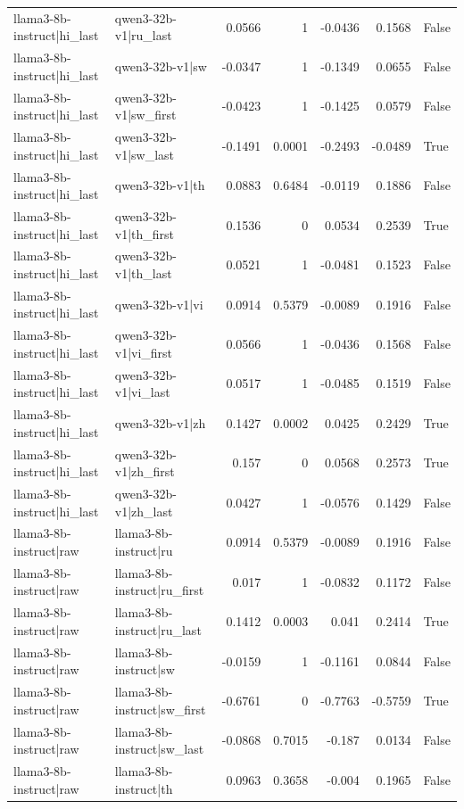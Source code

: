 \begin{table}
\begin{tabular}{l l r r r r l}
llama3-8b-instruct|hi_last & qwen3-32b-v1|ru_last & 0.0566 & 1 & -0.0436 & 0.1568 & False \\
llama3-8b-instruct|hi_last & qwen3-32b-v1|sw & -0.0347 & 1 & -0.1349 & 0.0655 & False \\
llama3-8b-instruct|hi_last & qwen3-32b-v1|sw_first & -0.0423 & 1 & -0.1425 & 0.0579 & False \\
llama3-8b-instruct|hi_last & qwen3-32b-v1|sw_last & -0.1491 & 0.0001 & -0.2493 & -0.0489 & True \\
llama3-8b-instruct|hi_last & qwen3-32b-v1|th & 0.0883 & 0.6484 & -0.0119 & 0.1886 & False \\
llama3-8b-instruct|hi_last & qwen3-32b-v1|th_first & 0.1536 & 0 & 0.0534 & 0.2539 & True \\
llama3-8b-instruct|hi_last & qwen3-32b-v1|th_last & 0.0521 & 1 & -0.0481 & 0.1523 & False \\
llama3-8b-instruct|hi_last & qwen3-32b-v1|vi & 0.0914 & 0.5379 & -0.0089 & 0.1916 & False \\
llama3-8b-instruct|hi_last & qwen3-32b-v1|vi_first & 0.0566 & 1 & -0.0436 & 0.1568 & False \\
llama3-8b-instruct|hi_last & qwen3-32b-v1|vi_last & 0.0517 & 1 & -0.0485 & 0.1519 & False \\
llama3-8b-instruct|hi_last & qwen3-32b-v1|zh & 0.1427 & 0.0002 & 0.0425 & 0.2429 & True \\
llama3-8b-instruct|hi_last & qwen3-32b-v1|zh_first & 0.157 & 0 & 0.0568 & 0.2573 & True \\
llama3-8b-instruct|hi_last & qwen3-32b-v1|zh_last & 0.0427 & 1 & -0.0576 & 0.1429 & False \\
llama3-8b-instruct|raw & llama3-8b-instruct|ru & 0.0914 & 0.5379 & -0.0089 & 0.1916 & False \\
llama3-8b-instruct|raw & llama3-8b-instruct|ru_first & 0.017 & 1 & -0.0832 & 0.1172 & False \\
llama3-8b-instruct|raw & llama3-8b-instruct|ru_last & 0.1412 & 0.0003 & 0.041 & 0.2414 & True \\
llama3-8b-instruct|raw & llama3-8b-instruct|sw & -0.0159 & 1 & -0.1161 & 0.0844 & False \\
llama3-8b-instruct|raw & llama3-8b-instruct|sw_first & -0.6761 & 0 & -0.7763 & -0.5759 & True \\
llama3-8b-instruct|raw & llama3-8b-instruct|sw_last & -0.0868 & 0.7015 & -0.187 & 0.0134 & False \\
llama3-8b-instruct|raw & llama3-8b-instruct|th & 0.0963 & 0.3658 & -0.004 & 0.1965 & False \\

\end{tabular}
\end{table}
